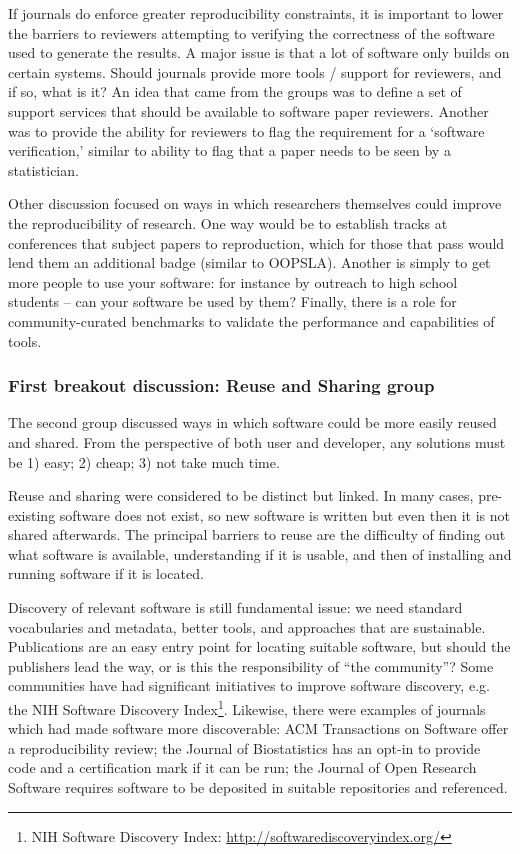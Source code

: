 \documentclass[11pt, oneside]{amsart}
\begin{document}
If journals do enforce greater reproducibility constraints, it is important to lower the barriers to reviewers attempting to verifying the correctness of the software used to generate the results. A major issue is that a lot of software only builds on certain systems. Should journals provide more tools / support for reviewers, and if so, what is it? An idea that came from the groups was to define a set of support services that should be available to software paper reviewers. Another was to provide the ability for reviewers to flag the requirement for a `software verification,' similar to ability to flag that a paper needs to be seen by a statistician.

Other discussion focused on ways in which researchers themselves could improve the reproducibility of research. One way would be to establish tracks at conferences that subject papers to reproduction, which for those that pass would lend them an additional badge (similar to OOPSLA). Another is simply to get more people to use your software: for instance by outreach to high school students -- can your software be used by them? Finally, there is a role for community-curated benchmarks to validate the performance and capabilities of tools.

\subsubsection{First breakout discussion: Reuse and Sharing group}

The second group discussed ways in which software could be more easily reused and shared. From the perspective of both user and developer, any solutions must be 1) easy; 2) cheap; 3) not take much time.

Reuse and sharing were considered to be distinct but linked. In many cases, pre-existing software does not exist, so new software is written but even then it is not shared afterwards. The principal barriers to reuse are the difficulty of finding out what software is available, understanding if it is usable, and then of installing and running software if it is located.

Discovery of relevant software is still fundamental issue: we need standard vocabularies and metadata, better tools, and approaches that are sustainable. Publications are an easy entry point for locating suitable software, but should the publishers lead the way, or is this the responsibility of ``the community''? Some communities have had significant initiatives to improve software discovery, e.g. the NIH Software Discovery Index\footnote{NIH Software Discovery Index: \url{http://softwarediscoveryindex.org/}}. Likewise, there were examples of journals which had made software more discoverable: ACM Transactions on Software offer a reproducibility review; the Journal of Biostatistics has an opt-in to provide code and a certification mark if it can be run; the Journal of Open Research Software requires software to be deposited in suitable repositories and referenced.
\end{document}
